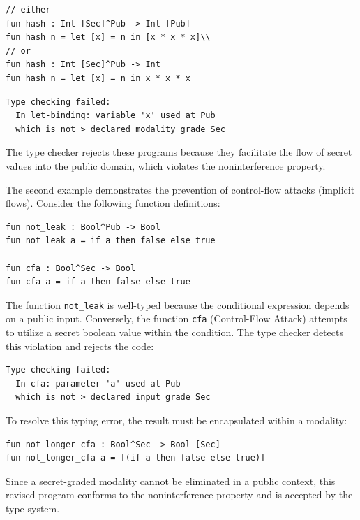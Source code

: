 \documentclass[conference]{IEEEtran}
\begin{document}
\begin{lstlisting}[style=mystyle]
// either
fun hash : Int [Sec]^Pub -> Int [Pub]
fun hash n = let [x] = n in [x * x * x]\\
// or
fun hash : Int [Sec]^Pub -> Int
fun hash n = let [x] = n in x * x * x
\end{lstlisting}

\begin{lstlisting}[style=mystyle]
Type checking failed: 
  In let-binding: variable 'x' used at Pub 
  which is not > declared modality grade Sec
\end{lstlisting}

The type checker rejects these programs because they facilitate the flow of secret values into the public domain, which violates the noninterference property.

The second example demonstrates the prevention of control-flow attacks (implicit flows). Consider the following function definitions:

\begin{lstlisting}[style=mystyle]
fun not_leak : Bool^Pub -> Bool
fun not_leak a = if a then false else true

fun cfa : Bool^Sec -> Bool
fun cfa a = if a then false else true
\end{lstlisting}

The function \texttt{not\_leak} is well-typed because the conditional expression depends on a public input. Conversely, the function \texttt{cfa} (Control-Flow Attack) attempts to utilize a secret boolean value within the condition. The type checker detects this violation and rejects the code:

\begin{lstlisting}[style=mystyle]
Type checking failed:
  In cfa: parameter 'a' used at Pub 
  which is not > declared input grade Sec
\end{lstlisting}

To resolve this typing error, the result must be encapsulated within a modality:

\begin{lstlisting}[style=mystyle]
fun not_longer_cfa : Bool^Sec -> Bool [Sec]
fun not_longer_cfa a = [(if a then false else true)]
\end{lstlisting}

Since a secret-graded modality cannot be eliminated in a public context, this revised program conforms to the noninterference property and is accepted by the type system.
\end{document}
